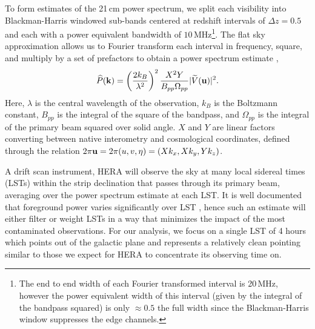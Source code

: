 \documentclass[twocolumn]{emulateapj}
\begin{document}
To form estimates of the 21\,cm power spectrum, we split each visibility into Blackman-Harris windowed sub-bands centered at redshift intervals of $\Delta z = 0.5$ and each with a power equivalent bandwidth of $10$\,MHz\footnote{The end to end width of each Fourier transformed interval is 20\,MHz, however the power equivalent width of this interval (given by the integral of the bandpass squared) is only $\approx 0.5$ the full width since the Blackman-Harris window suppresses the edge channels.}. The flat sky approximation allows us to Fourier transform each interval in frequency, square, and multiply by a set of prefactors to obtain a power spectrum estimate \citep{Parsons:2014},
\begin{equation}\label{eq:PS}
\widehat{P}({\bf k}) = \left( \frac{2 k_B}{\lambda^2} \right)^2 \frac{X^2 Y}{B_{pp} \Omega_{pp}} | \widetilde{V}({\bf u}) |^2.
\end{equation}
Here, $\lambda$ is the central wavelength of the observation, $k_B$ is the Boltzmann constant, $B_{pp}$ is the integral of the square of the bandpass, and $\Omega_{pp}$ is the integral of the primary beam squared over solid angle. $X$ and $Y$ are linear factors converting between native interometry and cosmological coordinates, defined through the relation $2 \pi {\bf u}=2 \pi (u,v,\eta) = (X k_x, X k_y, Y k_z)$. 

A drift scan instrument, HERA will observe the sky at many local sidereal times (LSTs) within the strip declination that passes through its primary beam, averaging over the power spectrum estimate at each LST. It is well documented that foreground power varies significantly over LST \citep{Thyagarajan:2015a}, hence such an estimate will either filter or weight LSTs in a way that minimizes the impact of the most contaminated observations. For our analysis, we focus on a single LST of 4 hours which points out of the galactic plane and represents a relatively clean pointing similar to those we expect for HERA to concentrate its observing time on.  
\end{document}
